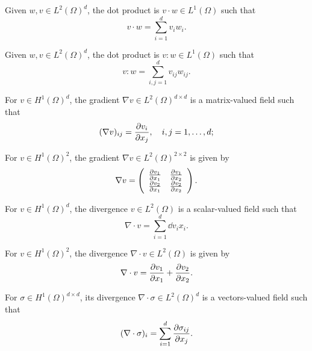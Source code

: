 \begin{definition}
  Given $w,v \in L^2(\Omega)^d$, the dot product is $v \cdot w \in L^1(\Omega)$ such that
  \begin{equation*}
    v \cdot w = \sum_{i=1}^d v_i w_i .
  \end{equation*}
\end{definition}
\begin{definition}
  Given $w,v \in L^2(\Omega)^d$, the dot product is $v : w \in L^1(\Omega)$ such that
  \begin{equation*}
    v : w = \sum_{i,j=1}^d v_{ij} w_{ij} .
  \end{equation*}
\end{definition}
\begin{definition}
  For $v \in H^1(\Omega)^d$, the gradient $\nabla v \in L^2(\Omega)^{d \times d}$ is a matrix-valued field such that
\begin{equation*}
  (\nabla v)_{ij} = \pp{v_i}{x_j}, \quad i,j = 1,\dots,d;
\end{equation*}
\end{definition}
\begin{corollary}
  For $v \in H^1(\Omega)^2$, the gradient $\nabla v \in L^2(\Omega)^{2 \times 2}$ is given by
\begin{equation*}
  \nabla v = \bmat{cc}
  \pp{v_1}{x_1} & \pp{v_1}{x_2} \\
  \pp{v_2}{x_1} & \pp{v_2}{x_2}
  \emat.
\end{equation*}
\end{corollary}
\begin{definition}
For $v \in H^1(\Omega)^d$, the divergence $v \in L^2(\Omega)$ is a scalar-valued field such that
\begin{equation*}
  \nabla \cdot v = \sum_{i = 1}^d \dd{v_i}{x_i}.
\end{equation*}
\end{definition}
\begin{corollary}
  For $v \in H^1(\Omega)^2$, the divergence $\nabla \cdot v \in L^2(\Omega)$ is given by
\begin{equation*}
  \nabla \cdot v = \pp{v_1}{x_1} + \pp{v_2}{x_2}.
\end{equation*}
\end{corollary}
\begin{definition}
For $\sigma \in H^1(\Omega)^{d \times d}$, its divergence $\nabla \cdot \sigma \in L^2(\Omega)^d$ is a vectors-valued field such that
\begin{equation*}
  (\nabla \cdot \sigma)_i = \sum_{i=1}^d \pp{\sigma_{ij}}{x_j}.
\end{equation*}
\end{definition}

